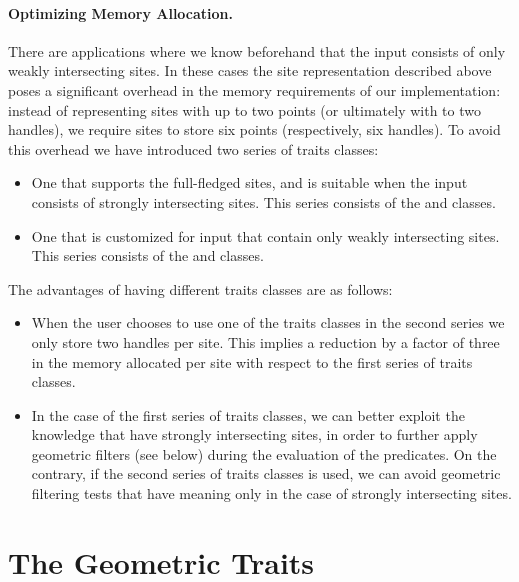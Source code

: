 \paragraph{Optimizing Memory Allocation.}
There are applications where we know beforehand that the input
consists of only weakly intersecting sites. In these cases the site
representation described above poses a significant overhead in the
memory requirements of our implementation: instead of representing
sites with up to two points (or ultimately with to two handles), we
require sites to store six points (respectively, six handles). To
avoid this overhead we have introduced two series of traits classes:
\begin{itemize}
\item One that supports the full-fledged sites, and is suitable when
  the input consists of strongly intersecting sites. This series
  consists of the 
   and
  classes.
\item One that is customized for input that contain only weakly
  intersecting sites. This series consists of the
   and
  classes.
\end{itemize}
The advantages of having different traits classes are as follows:
\begin{itemize}
\item When the user chooses to use one of the traits classes in the
  second series we only store two handles per site. This implies a
  reduction by a factor of three in the memory allocated per site with
  respect to the first series of traits classes.
\item In the case of the first series of traits classes, we can better
  exploit the knowledge that have strongly intersecting sites, in
  order to further apply geometric filters (see below) during the
  evaluation of the predicates. On the contrary, if the second series
  of traits classes is used, we can avoid geometric filtering tests
  that have meaning only in the case of strongly intersecting sites.
\end{itemize}


\section{The Geometric Traits\label{sec:sdg2-traits}}

